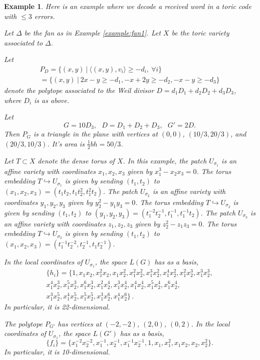 \documentclass[12pt]{article}
\newtheorem{example}[theorem]{Example}
\begin{document}
\begin{example}

Here is an example where we decode 
a received word in a toric code with $\leq 3$ errors.

Let $\Delta$ be the fan as in Example \ref{example:fan1}.
Let $X$ be the toric variety associated to $\Delta$.

Let 
\[
\begin{array}{c}
P_D=\{(x,y)\ |\ \langle (x,y),v_i\rangle \geq -d_i, \ \forall i\}\\
=\{(x,y)\ |\ 2x-y \geq -d_1, -x+2y \geq -d_2, -x-y \geq -d_3 
\}
\end{array}
\]
denote the polytope associated to the Weil
divisor $D=d_1D_1+d_2D_2+d_3D_3$,
where $D_i$ is as above. 

Let 
\[
G=10D_3,\ \ \ 
D=D_1+D_2+D_3,\ \ \ G'=2D.
\]
Then $P_G$ is a triangle in the plane 
with vertices at $(0,0)$, $(10/3,20/3)$, and $(20/3,10/3)$. 
It's area is $\frac{1}{2}bh=50/3$.

Let $T\subset X$ denote the dense torus of $X$.
In this example, the patch $U_{\sigma_1}$ is an affine variety with 
coordinates $x_1,x_2,x_3$ given by $x_1^3-x_2x_3=0$. 
The torus embedding
$T\hookrightarrow U_{\sigma_1}$ is given by
sending $(t_1,t_2)$ to 
$(x_1,x_2,x_3)=(t_1t_2,t_1t_2^2,t_1^2t_2)$.
The patch $U_{\sigma_2}$ is an affine variety with 
coordinates $y_1,y_2,y_3$ given by $y_2^2-y_1y_3=0$. 
The torus embedding
$T\hookrightarrow U_{\sigma_2}$ is given by
sending $(t_1,t_2)$ to 
$(y_1,y_2,y_3)=(t_1^{-2}t_2^{-1},t_1^{-1},t_1^{-1}t_2)$.
The patch $U_{\sigma_3}$ is an affine variety with 
coordinates $z_1,z_2,z_3$ given by $z_2^2-z_1z_3=0$. 
The torus embedding
$T\hookrightarrow U_{\sigma_3}$ is given by
sending $(t_1,t_2)$ to 
$(x_1,x_2,x_3)=(t_1^{-1}t_2^{-2},t_2^{-1},t_1t_2^{-1})$.

In the local coordinates of $U_{\sigma_1}$, the
space $L(G)$ has as a basis,
\[
\begin{array}{c}
\{h_i\}=
\{ 1, x_1 x_2, x_1^2 x_2, x_1 x_2^2, x_1^2 x_2^2, 
x_1^3 x_2^2, x_1^4 x_2^2, x_1^2 x_2^3, x_1^3 x_2^3,\\ 
x_1^4 x_2^3, x_1^5 x_2^3, x_1^6 x_2^3, x_1^2 x_2^4, 
x_1^3 x_2^4, x_1^4 x_2^4, x_1^5 x_2^4, x_1^6 x_2^4, \\
x_1^3 x_2^5, x_1^4 x_2^5, x_1^5 x_2^5, x_1^3 x_2^6, 
x_1^4 x_2^6\}\, .
\end{array}
\]
In particular, it is 22-dimensional.

The polytope $P_{G'}$ has vertices at
$(-2,-2)$, $(2,0)$, $(0,2)$.
In the local coordinates of $U_{\sigma_1}$, the
space $L(G')$ has as a basis,
\[
\{f_i\}=
\{ x_1^{-2}x_2^{-2}, x_1^{-1}, x_2^{-1}, x_1^{-1}x_2^{-1},  1, x_1, x_1^2, 
x_1x_2, x_2, x_2^2\}.
\]
In particular, it is 10-dimensional.


\end{example}
\end{document}
